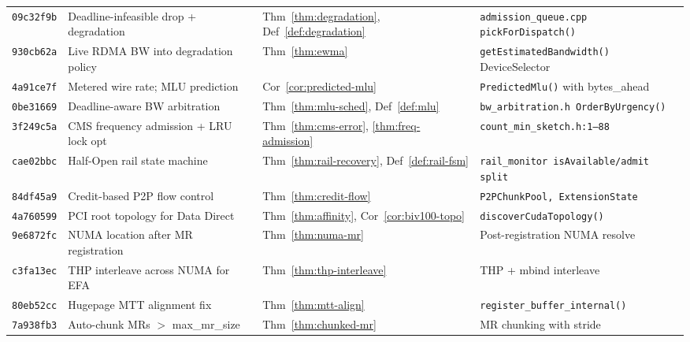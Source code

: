 \documentclass[11pt,a4paper,twoside]{article}
\theoremstyle{plain}
\theoremstyle{definition}
\theoremstyle{remark}
\begin{document}
\begin{small}
\begin{longtable}{p{1.6cm}p{4.5cm}p{2.5cm}p{4.5cm}}
\texttt{09c32f9b} & Deadline-infeasible drop + degradation &
  Thm~\ref{thm:degradation}, Def~\ref{def:degradation} &
  \texttt{admission\_queue.cpp pickForDispatch()} \\

\texttt{930cb62a} & Live RDMA BW into degradation policy &
  Thm~\ref{thm:ewma} &
  \texttt{getEstimatedBandwidth()} DeviceSelector \\

\texttt{4a91ce7f} & Metered wire rate; MLU prediction &
  Cor~\ref{cor:predicted-mlu} &
  \texttt{PredictedMlu()} with bytes\_ahead \\

\texttt{0be31669} & Deadline-aware BW arbitration &
  Thm~\ref{thm:mlu-sched}, Def~\ref{def:mlu} &
  \texttt{bw\_arbitration.h OrderByUrgency()} \\

\texttt{3f249c5a} & CMS frequency admission + LRU lock opt &
  Thm~\ref{thm:cms-error}, \ref{thm:freq-admission} &
  \texttt{count\_min\_sketch.h:1--88} \\

\texttt{cae02bbc} & Half-Open rail state machine &
  Thm~\ref{thm:rail-recovery}, Def~\ref{def:rail-fsm} &
  \texttt{rail\_monitor isAvailable/admit split} \\

\texttt{84df45a9} & Credit-based P2P flow control &
  Thm~\ref{thm:credit-flow} &
  \texttt{P2PChunkPool, ExtensionState} \\

\texttt{4a760599} & PCI root topology for Data Direct &
  Thm~\ref{thm:affinity}, Cor~\ref{cor:biv100-topo} &
  \texttt{discoverCudaTopology()} \\

\texttt{9e6872fc} & NUMA location after MR registration &
  Thm~\ref{thm:numa-mr} &
  Post-registration NUMA resolve \\

\texttt{c3fa13ec} & THP interleave across NUMA for EFA &
  Thm~\ref{thm:thp-interleave} &
  THP + mbind interleave \\

\texttt{80eb52cc} & Hugepage MTT alignment fix &
  Thm~\ref{thm:mtt-align} &
  \texttt{register\_buffer\_internal()} \\

\texttt{7a938fb3} & Auto-chunk MRs $>$ max\_mr\_size &
  Thm~\ref{thm:chunked-mr} &
  MR chunking with stride \\


\end{longtable}
\end{small}
\end{document}
